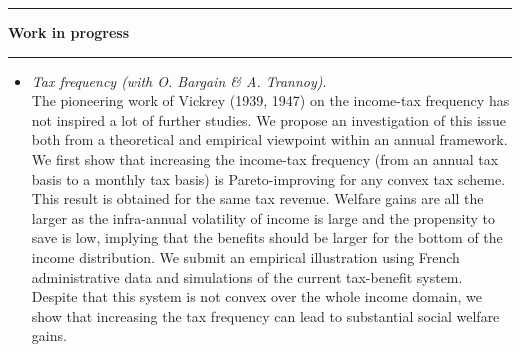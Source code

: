 \documentclass[a4paper,11pt]{article} %
\newcommand{\titre}[1]{%
	\begin{center}
	\rule{\textwidth}{1pt}
	\par\vspace{0.1cm}
        \textbf{\large #1}
	\par\rule{\textwidth}{1pt}
	\end{center}
	}
\begin{document}
\titre{Work in progress}
\begin{itemize}






\item{\emph{Tax frequency (with O. Bargain \& A. Trannoy)}}. \\
The pioneering work of Vickrey  (1939, 1947) on the income-tax frequency has not inspired a lot of further studies. We propose an investigation of this issue both from a theoretical and empirical viewpoint within an annual framework. We first show that increasing the income-tax frequency (from an annual tax basis to a monthly tax basis) is Pareto-improving for any convex tax scheme. This result is obtained for the same tax revenue. Welfare gains are all the larger as the infra-annual volatility of income is large and the propensity to save is low, implying that the benefits should be larger for the bottom of the income distribution. We submit an empirical illustration using French administrative data and simulations of the current tax-benefit system. Despite that this system is not convex over the whole income domain, we show that increasing the tax frequency can lead to substantial social welfare gains. 


\end{itemize}
\end{document}
